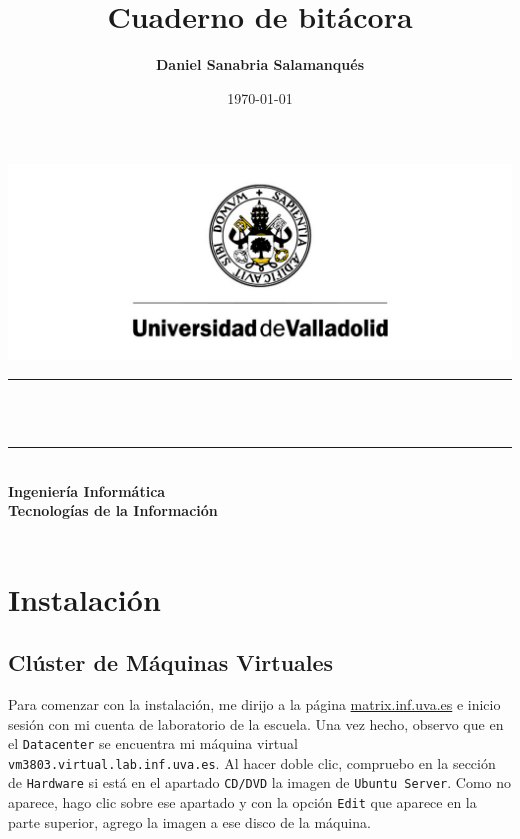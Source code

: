 \documentclass[10pt]{article}
\title{\textbf{Cuaderno de bitácora}}
\author{\textbf{\small Daniel Sanabria Salamanqués}}
\date{\today}
\makeatletter
\let\thetitle\@title
\let\theauthor\@author
\let\thedate\@date
\makeatother
\begin{document}
	
	\begin{titlepage}
		\centering
		\includegraphics[scale=0.3]{uva-3881270087.pdf}\\[0.5cm]
		\rule{\linewidth}{0.2mm}\\[0.4cm]
		{\huge\bfseries \thetitle}\\
		\rule{\linewidth}{0.2mm}\\[1.5cm]
		{\Large\bfseries Ingeniería Informática}\\[0.3cm]
		{\Large\bfseries Tecnologías de la Información}\\[1cm]
		{\Large \theauthor}\\[1.5cm]
		{\Large \thedate}
	\end{titlepage}
	
	\renewcommand{\contentsname}{Índice}
	\tableofcontents
	\clearpage
	\section{Instalación}
	\subsection{Clúster de Máquinas Virtuales}
	Para comenzar con la instalación, me dirijo a la página \url{matrix.inf.uva.es} e inicio sesión con mi cuenta de laboratorio de la escuela. Una vez hecho, observo que en el \verb|Datacenter| se encuentra mi máquina virtual \verb|vm3803.virtual.lab.inf.uva.es|. Al hacer doble clic, compruebo en la sección de \verb|Hardware| si está en el apartado \verb|CD/DVD| la imagen de \verb|Ubuntu Server|. Como no aparece, hago clic sobre ese apartado y con la opción \verb|Edit| que aparece en la parte superior, agrego la imagen a ese disco de la máquina.
\end{document}
